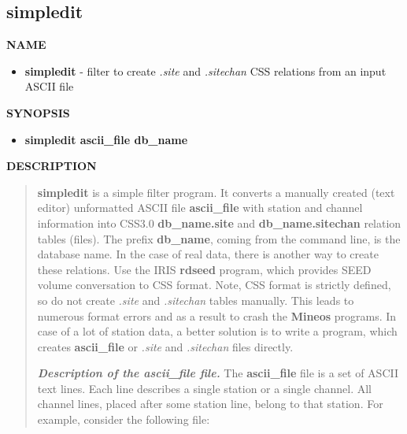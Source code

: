 \subsection{simpledit}
\vred
{\bf NAME}
\vred
\begin{itemize}
\vred
\item[] {\bf simpledit} - filter to create {\it .site} and {\it .sitechan} CSS 
relations from an input ASCII file
\vred
\end{itemize}
\vred
{\bf SYNOPSIS}
\vred
\begin{itemize}
\vred
\item[] {\bf simpledit ascii\_file db\_name}
\end{itemize}
\vred
{\bf DESCRIPTION}
\vred
\begin{quote}
\vred
{\bf simpledit} is a simple filter program. It converts a manually created
(text editor) unformatted ASCII file {\bf ascii\_file} with station and
channel information into CSS3.0 {\bf db\_name.site} and 
{\bf db\_name.sitechan} relation tables (files). The prefix {\bf db\_name}, 
coming from the command line, is the database name.
In the case of real data, there is another way to create  these relations. 
Use the IRIS {\bf rdseed} program, which provides  SEED volume conversation
to CSS format. Note, CSS format is strictly defined, so do not
create {\it .site} and {\it .sitechan} tables manually. This leads to numerous
format errors and as a result to crash the {\bf Mineos} programs. 
In case of a lot of station data, a better solution is to write a program,
which creates {\bf ascii\_file} or {\it .site} and {\it .sitechan} files directly.

{\bf \emph{Description of the {\bf ascii\_file} file.}} The {\bf ascii\_file}
file is a set of ASCII text lines. Each line describes a single station or a
single channel. All channel lines, placed after some station line, belong
to that station. 
\newpage
For example, consider the following file: 


\end{quote}
